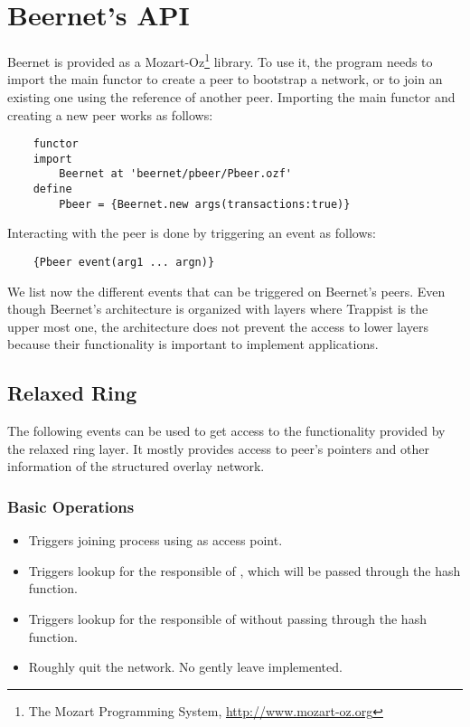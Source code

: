 
\chapter{Beernet's API}
\label{apx:beernet}

Beernet is provided as a Mozart-Oz\footnote{The Mozart Programming System,
\url{http://www.mozart-oz.org}} library. To use it, the program needs to
import the main functor to create a peer to bootstrap a network, or to join an
existing one using the reference of another peer. Importing the main functor
and creating a new peer works as follows:

\begin{lstlisting}
	functor
	import
		Beernet at 'beernet/pbeer/Pbeer.ozf'
	define
		Pbeer = {Beernet.new args(transactions:true)}
\end{lstlisting}

Interacting with the peer is done by triggering an event as follows:

\begin{lstlisting}
	{Pbeer event(arg1 ... argn)}
\end{lstlisting}

We list now the different events that can be triggered on Beernet's peers.
Even though Beernet's architecture is organized with layers where Trappist is
the upper most one, the architecture does not prevent the access to lower
layers because their functionality is important to implement applications.

\section{Relaxed Ring}

The following events can be used to get access to the functionality provided
by the relaxed ring layer. It mostly provides access to peer's pointers and
other information of the structured overlay network. 

\subsection{Basic Operations}

\begin{itemize}

	\item {} Triggers joining process using 
as access point.

	\item {} Triggers lookup for the responsible of
, which will be passed through the hash function.

	\item {} Triggers lookup for the responsible of
 without passing  through the hash function.

	\item {} Roughly quit the network. No gently leave implemented.
 
\end{itemize}

